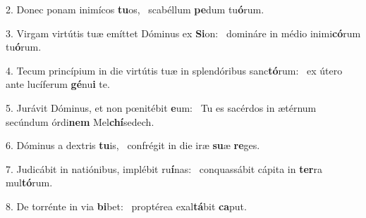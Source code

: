 2. Donec ponam inimícos \textbf{tu}os, \ast\  scabéllum \textbf{pe}dum tu\textbf{ó}rum.\

3. Virgam virtútis tuæ emíttet Dóminus ex \textbf{Si}on: \ast\  domináre in médio inimi\textbf{có}rum tu\textbf{ó}rum.\

4. Tecum princípium in die virtútis tuæ in splendóribus sanc\textbf{tó}rum: \ast\  ex útero ante lucíferum \textbf{gé}nu\textbf{i} te.\

5. Jurávit Dóminus, et non pœnitébit \textbf{e}um: \ast\  Tu es sacérdos in ætérnum secúndum órdi\textbf{nem} Mel\textbf{chí}sedech.\

6. Dóminus a dextris \textbf{tu}is, \ast\  confrégit in die iræ \textbf{su}æ \textbf{re}ges.\

7. Judicábit in natiónibus, implébit ru\textbf{í}nas: \ast\  conquassábit cápita in \textbf{ter}ra mul\textbf{tó}rum.\

8. De torrénte in via \textbf{bi}bet: \ast\  proptérea exal\textbf{tá}bit \textbf{ca}put.\

